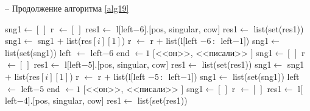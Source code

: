 \documentclass[main]{subfiles}
\begin{document}
\begin{algorithm}
	\caption{-- Продолжение алгоритма \ref{alg19}}\label{alg20}
	\begin{algorithmic}[1]
		\State sng1$\gets [\,]$
		\State r $\gets [\, ]$
		\State res1$\gets$ l$[$left$-6]$.$[$pos, singular, cow$]$
		\State res1$\gets$ list(set(res1))
		\State sng1$\gets$ sng1 $+$ list(res$[i][1]$)
		\State r $\gets$ r $+$ list(l$[$left $-6\, :\, $ left$-1 ]$)
		\EndIf
		\EndFor	
		\State sng1$\gets$ list(set(sng1))
		\State left $\gets$ left$-6$
		\State end $\gets 1$
		\State \Return $[$<<он>>, <<писали>> $]$
		\EndIf
		\EndIf
		\State sng1$\gets [\,]$
		\State r $\gets [\, ]$
		\State res1$\gets$ l$[$left$-5]$.$[$pos, singular, cow$]$
		\State res1$\gets$ list(set(res1))
		\State sng1$\gets$ sng1 $+$ list(res$[i][1]$)
		\State r $\gets$ r $+$ list(l$[$left $-5\, :\, $ left$-1 ]$)
		\EndIf
		\EndFor	
		\State sng1$\gets$ list(set(sng1))
		\State left $\gets$ left$-5$
		\State end $\gets 1$
		\State \Return $[$<<он>>, <<писали>> $]$
		\EndIf
		\EndIf
		\State sng1$\gets [\,]$
		\State r $\gets [\, ]$
		\State res1$\gets$ l$[$left$-4]$.$[$pos, singular, cow$]$
		\State res1$\gets$ list(set(res1))
	\end{algorithmic}
\end{algorithm}
\end{document}
